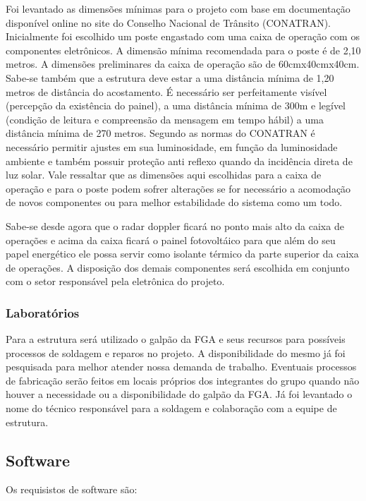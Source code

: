 Foi levantado as dimensões mínimas para o projeto com base em documentação
disponível online no site do Conselho Nacional de Trânsito (CONATRAN).
Inicialmente foi escolhido um poste engastado com uma caixa de operação com os
componentes eletrônicos. A dimensão mínima recomendada para o poste é de 2,10
metros. A dimensões preliminares da caixa de operação são de 60cmx40cmx40cm.
Sabe-se também que a estrutura deve estar a uma distância mínima de 1,20 metros
de distância do acostamento. É necessário ser perfeitamente visível (percepção da
existência do painel), a uma distância mínima de 300m e legível (condição de leitura
e compreensão da mensagem em tempo hábil) a uma distância mínima de 270
metros. Segundo as normas do CONATRAN é necessário permitir ajustes em sua
luminosidade, em função da luminosidade ambiente e também possuir proteção anti
reflexo quando da incidência direta de luz solar.
Vale ressaltar que as dimensões aqui escolhidas para a caixa de operação e para o
poste podem sofrer alterações se for necessário a acomodação de novos
componentes ou para melhor estabilidade do sistema como um todo.

Sabe-se desde agora que o radar doppler ficará no ponto mais alto da caixa de
operações e acima da caixa ficará o painel fotovoltáico para que além do seu papel
energético ele possa servir como isolante térmico da parte superior da caixa de
operações. A disposição dos demais componentes será escolhida em conjunto com
o setor responsável pela eletrônica do projeto.

\subsubsection{Laboratórios}
Para a estrutura será utilizado o galpão da FGA e seus recursos para possíveis
processos de soldagem e reparos no projeto. A disponibilidade do mesmo já foi
pesquisada para melhor atender nossa demanda de trabalho. Eventuais processos
de fabricação serão feitos em locais próprios dos integrantes do grupo quando não
houver a necessidade ou a disponibilidade do galpão da FGA. Já foi levantado o
nome do técnico responsável para a soldagem e colaboração com a equipe de
estrutura.

\subsection{Software}

Os requisistos de software são:

